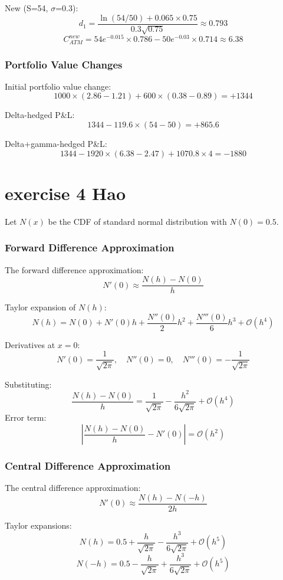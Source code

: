 \documentclass{article}
\begin{document}
New (S=54, $\sigma$=0.3):
\[
    d_1 = \frac{\ln(54/50)+0.065\times0.75}{0.3\sqrt{0.75}} \approx 0.793
\]
\[
    C_{ATM}^{new} = 54e^{-0.015}\times0.786 - 50e^{-0.03}\times0.714 \approx 6.38
\]

\subsubsection*{Portfolio Value Changes}

Initial portfolio value change:
\[
    1000 \times (2.86 - 1.21) + 600 \times (0.38 - 0.89) = +1344
\]

Delta-hedged P\&L:
\[
    1344 - 119.6 \times (54 - 50) = +865.6
\]

Delta+gamma-hedged P\&L:
\[
    1344 - 1920\times(6.38-2.47) + 1070.8\times4 = -1880
\]


\section{exercise 4 Hao}

Let $N(x)$ be the CDF of standard normal distribution with $N(0)=0.5$.

\subsubsection*{Forward Difference Approximation}
The forward difference approximation:
\[
    N'(0) \approx \frac{N(h)-N(0)}{h}
\]

Taylor expansion of $N(h)$:
\[
    N(h) = N(0) + N'(0)h + \frac{N''(0)}{2}h^2 + \frac{N'''(0)}{6}h^3 + \mathcal{O}(h^4)
\]

Derivatives at $x=0$:
\[
    N'(0) = \frac{1}{\sqrt{2\pi}}, \quad N''(0)=0, \quad N'''(0)=-\frac{1}{\sqrt{2\pi}}
\]

Substituting:
\[
    \frac{N(h)-N(0)}{h} = \frac{1}{\sqrt{2\pi}} - \frac{h^2}{6\sqrt{2\pi}} + \mathcal{O}(h^4)
\]
Error term:
\[
    \left|\frac{N(h)-N(0)}{h}-N'(0)\right| = \mathcal{O}(h^2)
\]

\subsubsection*{Central Difference Approximation}
The central difference approximation:
\[
    N'(0) \approx \frac{N(h)-N(-h)}{2h}
\]

Taylor expansions:
\[
    N(h) = 0.5 + \frac{h}{\sqrt{2\pi}} - \frac{h^3}{6\sqrt{2\pi}} + \mathcal{O}(h^5)
\]
\[
    N(-h) = 0.5 - \frac{h}{\sqrt{2\pi}} + \frac{h^3}{6\sqrt{2\pi}} + \mathcal{O}(h^5)
\]
\end{document}
